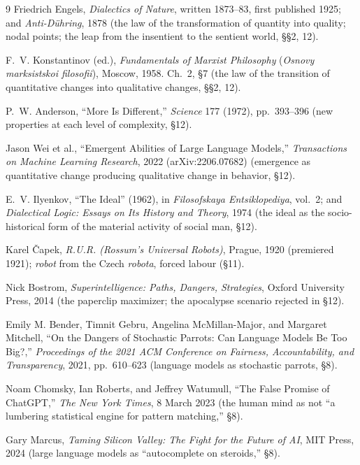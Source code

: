 \documentclass[11pt]{article}
\begin{document}
\begin{thebibliography}{9}
 Friedrich Engels, \textit{Dialectics of Nature},
written 1873--83, first published 1925; and \textit{Anti-Dühring},
1878 (the law of the transformation of quantity into quality; nodal
points; the leap from the insentient to the sentient world, §§2, 12).

 F.~V. Konstantinov (ed.),
\textit{Fundamentals of Marxist Philosophy} (\textit{Osnovy
marksistskoi filosofii}), Moscow, 1958. Ch.~2, §7 (the law of the
transition of quantitative changes into qualitative changes, §§2, 12).

 P.~W. Anderson, ``More Is Different,''
\textit{Science} 177 (1972), pp.~393--396 (new properties at each level
of complexity, §12).

 Jason Wei et al., ``Emergent Abilities of Large
Language Models,'' \textit{Transactions on Machine Learning Research},
2022 (arXiv:2206.07682) (emergence as quantitative change producing
qualitative change in behavior, §12).

 E.~V. Ilyenkov, ``The Ideal'' (1962), in
\textit{Filosofskaya Entsiklopediya}, vol.~2; and \textit{Dialectical
Logic: Essays on Its History and Theory}, 1974 (the ideal as the
socio-historical form of the material activity of social man, §12).

 Karel \v{C}apek, \textit{R.U.R. (Rossum's Universal
Robots)}, Prague, 1920 (premiered 1921); \emph{robot} from the Czech
\emph{robota}, forced labour (§11).

 Nick Bostrom, \textit{Superintelligence: Paths,
Dangers, Strategies}, Oxford University Press, 2014 (the paperclip
maximizer; the apocalypse scenario rejected in §12).

 Emily M. Bender, Timnit Gebru, Angelina
McMillan-Major, and Margaret Mitchell, ``On the Dangers of Stochastic
Parrots: Can Language Models Be Too Big?,'' \textit{Proceedings of the
2021 ACM Conference on Fairness, Accountability, and Transparency},
2021, pp.~610--623 (language models as stochastic parrots, §8).

 Noam Chomsky, Ian Roberts, and Jeffrey Watumull,
``The False Promise of ChatGPT,'' \textit{The New York Times}, 8 March
2023 (the human mind as not ``a lumbering statistical engine for
pattern matching,'' §8).

 Gary Marcus, \textit{Taming Silicon Valley: The
Fight for the Future of AI}, MIT Press, 2024 (large language models as
``autocomplete on steroids,'' §8).


\end{thebibliography}
\end{document}
